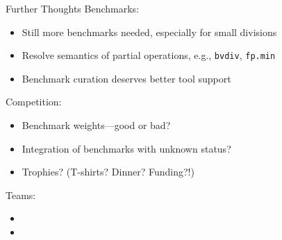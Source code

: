 \documentclass{beamer}
\begin{document}

\begin{frame}{Further Thoughts}
  Benchmarks:
  \begin{itemize}
  \item Still more benchmarks needed, especially for small divisions
  \item Resolve semantics of partial operations, e.g., {\tt bvdiv},
    {\tt fp.min}
  \item Benchmark curation deserves better tool support
  \end{itemize}

  \bigskip

  Competition:
  \begin{itemize}
  \item Benchmark weights---good or bad?
  \item Integration of benchmarks with unknown status?
  \item Trophies? (T-shirts? Dinner? Funding?!)
  \end{itemize}

  \bigskip

  Teams:
  \begin{itemize}
  \item {}
  \item {}
  \end{itemize}
\end{frame}

\end{document}
